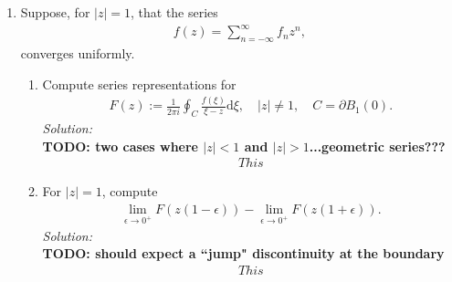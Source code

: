 \documentclass[10pt]{amsart}
\newcommand{\D}{\mathrm{d}}
\theoremstyle{nonumberplain}
\begin{document}
\begin{enumerate}[label={\bf {\arabic*}:}]
\item Suppose, for $|z| = 1$, that the series
\begin{align*}
f(z) = \sum_{n = -\infty}^\infty f_n z^n,
\end{align*}
converges uniformly.
\begin{enumerate}
\item Compute series representations for
\begin{align*}
F(z) := \frac{1}{2 \pi i} \oint_{C} \frac{f(\xi)}{\xi - z} \D \xi,
\quad |z| \neq 1, \quad C = \partial B_1(0).
\end{align*}
\textit{Solution:} \\
\textbf{TODO: two cases where $|z| < 1$ and $|z| > 1$...geometric series???}
\begin{align*}
This
\end{align*}

\item For $|z| = 1$, compute
\begin{align*}
\lim_{\epsilon \to 0^+} F( z(1 - \epsilon)) -       \lim_{\epsilon \to 0^+} F( z(1 + \epsilon)) .
\end{align*}
\textit{Solution:} \\
\textbf{TODO: should expect a ``jump" discontinuity at the boundary}
\begin{align*}
This
\end{align*}

\end{enumerate}
\end{enumerate}
\end{document}

